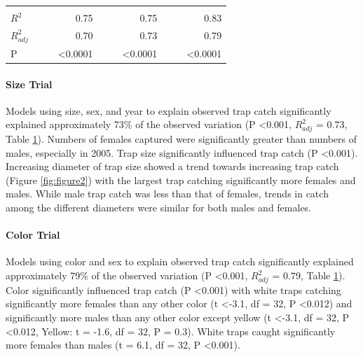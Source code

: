 \documentclass[alpha-refs]{wiley-article}
\begin{document}
\begin{table}[]
\begin{tabular}{lrrrrrrrrr}
              &                       &                        &                       &                       &                        &                       &                       &                        &                       \\
$R^2$            &                       &                        & 0.75                  &                       &                        & 0.75                  &                       &                        & 0.83                  \\
$R^2_{adj}$         &                       &                        & 0.70                  &                       &                        & 0.73                  &                       &                        & 0.79                  \\
P             &                       &                        & \textless 0.0001      &                       &                        & \textless 0.0001      &                       &                        & \textless 0.0001     
\end{tabular}
\label{table:1}
\end{table}



\paragraph{Size Trial} Models using size, sex, and year to explain observed trap catch significantly explained approximately 73\% of the observed variation (P \textless 0.001, $R^2_{adj}$ = 0.73, Table \ref{table:1}).  Numbers of females captured were significantly greater than numbers of males, especially in 2005. Trap size significantly influenced trap catch (P \textless 0.001).  Increasing diameter of trap size showed a trend towards increasing trap catch (Figure \ref{fig:figure2}) with the largest trap catching significantly more females and males.  While male trap catch was less than that of females, trends in catch among the different diameters were similar for both males and females.  


\paragraph{Color Trial} Models using color and sex to explain observed trap catch significantly explained approximately 79\% of the observed variation (P \textless 0.001, $R^2_{adj}$ = 0.79, Table \ref{table:1}). Color significantly influenced trap catch (P \textless 0.001) with white traps catching significantly more females than any other color (t \textless -3.1, df = 32, P \textless 0.012) and significantly more males than any other color except yellow (t \textless -3.1, df = 32, P \textless 0.012, Yellow: t = -1.6, df = 32, P = 0.3).  White traps caught significantly more females than males (t = 6.1, df = 32, P \textless 0.001).
\end{document}
